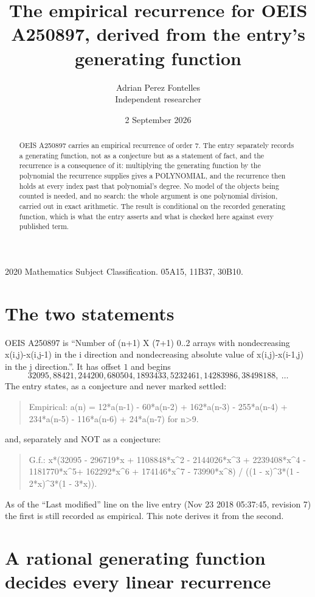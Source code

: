 \documentclass[11pt,a4paper]{article}
\title{The empirical recurrence for OEIS A250897, derived from the entry's generating function}
\author{Adrian Perez Fontelles\\ \small Independent researcher}
\date{2 September 2026}
\theoremstyle{plain}
\theoremstyle{definition}
\begin{document}
\maketitle

\begin{abstract}
OEIS A250897 carries an empirical recurrence of order $7$. The entry separately records a
generating function, not as a conjecture but as a statement of fact, and the recurrence is a
consequence of it: multiplying the generating function by the polynomial the recurrence
supplies gives a POLYNOMIAL, and the recurrence then holds at every index past that
polynomial's degree. No model of the objects being counted is needed, and no search: the
whole argument is one polynomial division, carried out in exact arithmetic. The result is
conditional on the recorded generating function, which is what the entry asserts and what is
checked here against every published term.
\end{abstract}

\noindent\small 2020 Mathematics Subject Classification. 05A15, 11B37, 30B10.\normalsize

\section{The two statements}

OEIS A250897 is ``Number of (n+1) X (7+1) 0..2 arrays with nondecreasing x(i,j)-x(i,j-1) in the i direction and nondecreasing absolute value of x(i,j)-x(i-1,j) in the j direction.''. It has offset $1$ and begins
\[
32095, 88421, 244200, 680504, 1893433, 5232461, 14283986, 38498188,\ \dots
\]
The entry states, as a conjecture and never marked settled:
\begin{quote}
Empirical: a(n) = 12*a(n-1) - 60*a(n-2) + 162*a(n-3) - 255*a(n-4) + 234*a(n-5) - 116*a(n-6) + 24*a(n-7) for n>9.
\end{quote}
and, separately and NOT as a conjecture:
\begin{quote}
G.f.: x*(32095 - 296719*x + 1108848*x\^{}2 - 2144026*x\^{}3 + 2239408*x\^{}4 - 1181770*x\^{}5+ 162292*x\^{}6 + 174146*x\^{}7 - 73990*x\^{}8) / ((1 - x)\^{}3*(1 - 2*x)\^{}3*(1 - 3*x)).
\end{quote}
As of the ``Last modified'' line on the live entry (Nov 23 2018 05:37:45, revision 7) the first is still
recorded as empirical. This note derives it from the second.

\section{A rational generating function decides every linear recurrence}
\end{document}
